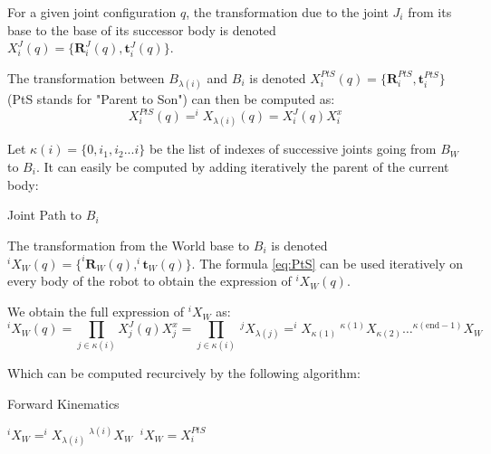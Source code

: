 For a given joint configuration $q$, the transformation due to the joint $J_i$ from its base to the base of its successor body is denoted \\$X^J_i(q) = \{\mathbf{R}^J_i(q), \mathbf{t}^J_i(q)\}$.

The transformation between $B_{\lambda(i)}$ and $B_i$ is denoted $X^{PtS}_i(q) = \{\mathbf{R}^{PtS}_i, \mathbf{t}^{PtS}_i\}$ (PtS stands for "Parent to Son") can then be computed as:
\begin{equation}
  X^{PtS}_i(q) = ^iX_{\lambda(i)}(q) = X^J_i(q) X^x_i
  \label{eq:PtS}
\end{equation}

Let $\kappa(i) =\{0, i_1, i_2 ... i\}$ be the list of indexes of successive joints going from $B_W$ to $B_i$.
It can easily be computed by adding iteratively the parent of the current body:

\begin{algorithm}
  \caption{Joint Path to $B_i$}
  \label{JP}
\begin{algorithmic}
  \EndWhile
\end{algorithmic}
\end{algorithm}

The transformation from the World base to $B_i$ is denoted \\ $^iX_W(q) = \{^i\mathbf{R}_W(q), ^i\mathbf{t}_W(q)\}$.
The formula \ref{eq:PtS} can be used iteratively on every body of the robot to obtain the expression of $^iX_W(q)$.

We obtain the full expression of $^iX_W$ as:
\begin{equation}
  ^iX_W(q) = \prod_{j\in\kappa(i)}X^J_j(q) X^x_j = \prod_{j\in\kappa(i)}\ ^jX_{\lambda(j)}
  = ^iX_{\kappa(1)}\ ^{\kappa(1)}X_{\kappa(2)} \dots ^{\kappa(\text{end}-1)}X_{W}
\end{equation}

Which can be computed recurcively by the following algorithm:

\begin{algorithm}
  \caption{Forward Kinematics}
  \label{FK}
\begin{algorithmic}
   $^iX_W = ^iX_{\lambda(i)}\ ^{\lambda(i)}X_W$
  \Else $\ ^iX_W = X^{PtS}_i$
  \EndIf
  \EndFor
\end{algorithmic}
\end{algorithm}

